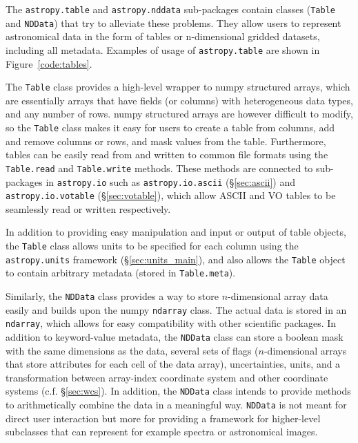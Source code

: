 \documentclass[traditabstract]{aa}
\begin{document}
The \texttt{astropy.table} and \texttt{astropy.nddata} sub-packages contain
classes (\texttt{Table} and \texttt{NDData}) that try to alleviate these
problems. They allow users to represent astronomical data in the form of tables
or n-dimensional gridded datasets, including all metadata. Examples of usage
of \texttt{astropy.table} are shown in Figure~\ref{code:tables}.

The \texttt{Table} class provides a high-level wrapper to \gls{numpy} structured
arrays, which are essentially arrays that have fields (or columns) with
heterogeneous data types, and any number of rows. \gls{numpy} structured arrays are
however difficult to modify, so the \texttt{Table} class makes it
easy for users to create a table from columns, add and remove columns or rows,
and mask values from the table. Furthermore, tables can be easily read from and
written to common file formats using the \texttt{Table.read} and
\texttt{Table.write} methods. These methods are connected to sub-packages in
\texttt{astropy.io} such as \texttt{astropy.io.ascii} (\S\ref{sec:ascii}) and
\texttt{astropy.io.votable} (\S\ref{sec:votable}), which allow ASCII and VO
tables to be seamlessly read or written respectively.

In addition to providing easy manipulation and input or output of table objects,
the \texttt{Table} class allows units to be specified for each column using the
\texttt{astropy.units} framework (\S\ref{sec:units_main}), and also allows the \texttt{Table} object to
contain arbitrary metadata (stored in \texttt{Table.meta}).

Similarly, the \texttt{NDData} class provides a way to store $n$-dimensional array
data easily and builds upon the \gls{numpy} \texttt{ndarray} class. The actual data is
stored in an \texttt{ndarray}, which allows for easy compatibility with
other scientific packages. In addition to keyword-value metadata, the
\texttt{NDData} class can store a boolean mask with the same dimensions as the
data, several sets of flags ($n$-dimensional arrays that store attributes for
each cell of the data array), uncertainties, units, and a transformation
between array-index coordinate system and other coordinate systems (c.f.
\S\ref{sec:wcs}). In addition, the \texttt{NDData} class intends to provide
methods to arithmetically combine the data in a meaningful way. \texttt{NDData}
is not meant for direct user interaction but more for providing a framework for
higher-level subclasses that can represent for example spectra or astronomical images.
\end{document}
